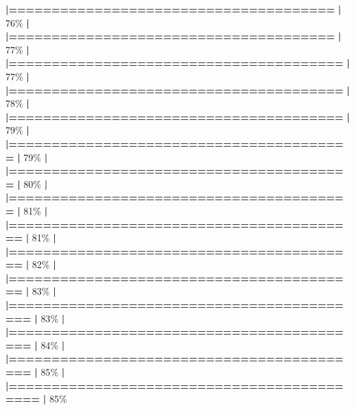 \documentclass[
]{book}
\newenvironment{Shaded}{\begin{snugshade}}{\end{snugshade}}
\newcommand{\DecValTok}[1]{\textcolor[rgb]{0.00,0.00,0.81}{#1}}
\newcommand{\ErrorTok}[1]{\textcolor[rgb]{0.64,0.00,0.00}{\textbf{#1}}}
\newcommand{\NormalTok}[1]{#1}
\newcommand{\SpecialCharTok}[1]{\textcolor[rgb]{0.81,0.36,0.00}{\textbf{#1}}}
\begin{document}
\begin{Shaded}
\begin{Highlighting}[]
  \ErrorTok{|======================================}            \ErrorTok{|}  \DecValTok{76}\NormalTok{\%}
  \SpecialCharTok{|}                                                        
  \ErrorTok{|======================================}            \ErrorTok{|}  \DecValTok{77}\NormalTok{\%}
  \SpecialCharTok{|}                                                        
  \ErrorTok{|=======================================}           \ErrorTok{|}  \DecValTok{77}\NormalTok{\%}
  \SpecialCharTok{|}                                                        
  \ErrorTok{|=======================================}           \ErrorTok{|}  \DecValTok{78}\NormalTok{\%}
  \SpecialCharTok{|}                                                        
  \ErrorTok{|=======================================}           \ErrorTok{|}  \DecValTok{79}\NormalTok{\%}
  \SpecialCharTok{|}                                                        
  \ErrorTok{|========================================}          \ErrorTok{|}  \DecValTok{79}\NormalTok{\%}
  \SpecialCharTok{|}                                                        
  \ErrorTok{|========================================}          \ErrorTok{|}  \DecValTok{80}\NormalTok{\%}
  \SpecialCharTok{|}                                                        
  \ErrorTok{|========================================}          \ErrorTok{|}  \DecValTok{81}\NormalTok{\%}
  \SpecialCharTok{|}                                                        
  \ErrorTok{|=========================================}         \ErrorTok{|}  \DecValTok{81}\NormalTok{\%}
  \SpecialCharTok{|}                                                        
  \ErrorTok{|=========================================}         \ErrorTok{|}  \DecValTok{82}\NormalTok{\%}
  \SpecialCharTok{|}                                                        
  \ErrorTok{|=========================================}         \ErrorTok{|}  \DecValTok{83}\NormalTok{\%}
  \SpecialCharTok{|}                                                        
  \ErrorTok{|==========================================}        \ErrorTok{|}  \DecValTok{83}\NormalTok{\%}
  \SpecialCharTok{|}                                                        
  \ErrorTok{|==========================================}        \ErrorTok{|}  \DecValTok{84}\NormalTok{\%}
  \SpecialCharTok{|}                                                        
  \ErrorTok{|==========================================}        \ErrorTok{|}  \DecValTok{85}\NormalTok{\%}
  \SpecialCharTok{|}                                                        
  \ErrorTok{|===========================================}       \ErrorTok{|}  \DecValTok{85}\NormalTok{\%}

\end{Highlighting}
\end{Shaded}
\end{document}
